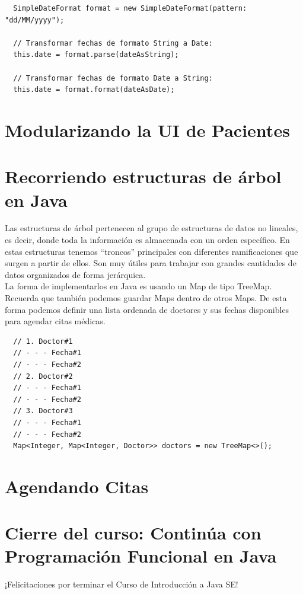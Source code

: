 \documentclass{article}
\begin{document}
\begin{verbatim}
  SimpleDateFormat format = new SimpleDateFormat(pattern: "dd/MM/yyyy");

  // Transformar fechas de formato String a Date:
  this.date = format.parse(dateAsString);

  // Transformar fechas de formato Date a String:
  this.date = format.format(dateAsDate);
\end{verbatim}


\section{Modularizando la UI de Pacientes}%


\section{Recorriendo estructuras de árbol en Java}%
Las estructuras de árbol pertenecen al grupo de estructuras de datos no
lineales, es decir, donde toda la información es almacenada con un orden
específico. En estas estructuras tenemos “troncos” principales con diferentes
ramificaciones que surgen a partir de ellos. Son muy útiles para trabajar con
grandes cantidades de datos organizados de forma jerárquica.\\

La forma de implementarlos en Java es usando un Map de tipo TreeMap. Recuerda
que también podemos guardar Maps dentro de otros Maps. De esta forma podemos
definir una lista ordenada de doctores y sus fechas disponibles para agendar
citas médicas.\\

\begin{verbatim}
  // 1. Doctor#1
  // - - - Fecha#1
  // - - - Fecha#2
  // 2. Doctor#2
  // - - - Fecha#1
  // - - - Fecha#2
  // 3. Doctor#3
  // - - - Fecha#1
  // - - - Fecha#2
  Map<Integer, Map<Integer, Doctor>> doctors = new TreeMap<>();
\end{verbatim}

\section{Agendando Citas}%


\section{Cierre del curso: Continúa con Programación Funcional en Java}%
¡Felicitaciones por terminar el Curso de Introducción a Java SE!
\end{document}
